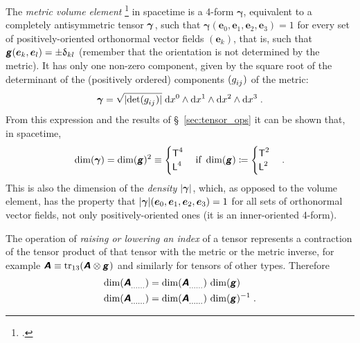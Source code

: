 \documentclass[a4paper,12pt,onecolumn,oneside,article,british]{memoir}
\makeatletter
\newcommand*{\mathte}[1]{\textbf{\textit{\textsf{#1}}}}
\newcommand*{\citep}{\footcites}
\newcommand*{\delt}{\updelta}%
\newcommand*{\di}{\mathrm{d}}%
\DeclareMathOperator{\tr}{tr}%
\newcommand*{\defd}{\coloneqq}
\DeclarePairedDelimiter\abs{\lvert}{\rvert}
\newcommand*{\sect}{\S}%
\newcommand*{\q}{}%
\DeclareRobustCommand*{\q}{%
  \mathbin{\mathpalette\bigcdot@{}}%
}
\newcommand*{\bigcdot@scalefactor}{0.7}
\newcommand*{\bigcdot@widthfactor}{1.5}
\newcommand*{\bigcdot@}[2]{%
  \sbox0{$#1\vcenter{}$}%
  \sbox2{$#1\cdot\m@th$}%
  \hbox to \bigcdot@widthfactor\wd2{%
    \hfil
    \raise\ht0\hbox{%
      \scalebox{\bigcdot@scalefactor}{%
        \lower\ht0\hbox{$#1\bullet\m@th$}%
      }%
    }%
    \hfil
  }%
}
\newcommand*{\Le}{\textsf{L}}
\newcommand*{\Ti}{\textsf{T}}
\newcommand*{\yA}{\mathte{A}}
\newcommand*{\yg}{\mathte{g}}
\renewcommand*{\i}{\indices}
\newcommand*{\dix}[1][i]{\di x^{#1}}
\newcommand*{\ye}{\bm{e}}
\newcommand*{\ygv}{\bm{\gamma}}
\makeatother
\begin{document}
\medskip

The \emph{metric volume element} \citep[\sect~6.2]{abrahametal1983_r1988}
in spacetime is a 4-form $\ygv$, equivalent to a completely antisymmetric
tensor $\ygv\i{_{\q\q\q\q}}$, such that
$\ygv(\ye_{0},\ye_{1},\ye_{2},\ye_{3})=1$ for every set of
positively-oriented orthonormal vector fields $(\ye_{k})$, that is, such
that $\yg(\ye_{k},\ye_{l})=\pm\delt_{kl}$ (remember that the orientation is
not determined by the metric). It has only one non-zero 
component, given by the square root of the determinant of the (positively
ordered) components $(g\i{_{ij}})$ of the metric:
\begin{equation}
  \label{eq:volume_elem}
  \ygv =
  \sqrt{\smash[b]{\abs{\det(g\i{_{ij}})}}}\;\dix[0]\land\dix[1]\land\dix[2]\land\dix[3] \;.
\end{equation}
From this expression and the results of \sect~\ref{sec:tensor_ops} it can
be shown that, in spacetime,
\begin{equation}
  \label{eq:dim_volume_elem}
  \dim(\ygv) = \dim(\yg)^{2} \equiv
    \begin{cases}
    \Ti^{4} \\
    \Le^{4}
  \end{cases}
  \text{if }\dim(\yg)\defd
  \begin{cases}
     \Ti^2 \\
    \Le^2
  \end{cases}.
\end{equation}
This is also the dimension of the \emph{density} $\abs{\ygv}$, which, as
opposed to the volume element, has the property that
$\abs{\ygv}(\ye_{0},\ye_{1},\ye_{2},\ye_{3})=1$ for all sets of orthonormal
vector fields, not only positively-oriented ones (it is an inner-oriented
4-form).

\medskip

The operation of \emph{raising or lowering an index} of a tensor represents a
contraction of the tensor product of that tensor with the metric or the
metric inverse, for example
$\yA\i{_{\q\q}} \equiv
\tr_{13}(\yA\i{^{\q}_{\q}}\otimes\yg\i{_{\q\q}})$ and similarly
for tensors of other types. Therefore
\begin{equation}
  \label{eq:raising_lowering}
  \begin{split}
  \dim(\yA\i{_{\dotso}_{\q}_{\dotso}}) &=
  \dim(\yA\i{_{\dotso}^{\q}_{\dotso}})\,\dim(\yg)
\\
  \dim(\yA\i{_{\dotso}^{\q}_{\dotso}}) &=
  \dim(\yA\i{_{\dotso}_{\q}_{\dotso}})\,\dim(\yg)^{-1} \;.
\end{split}
\end{equation}
\end{document}
